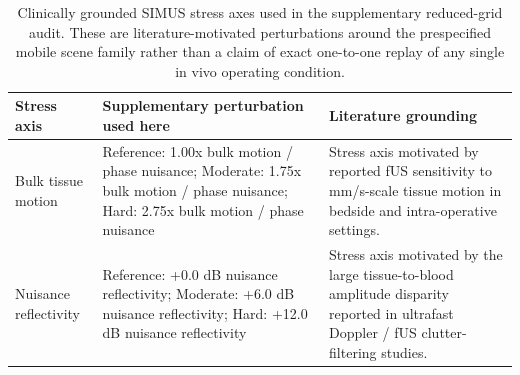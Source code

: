 \begin{table}[t]
\centering
\scriptsize
\setlength{\tabcolsep}{4pt}
\begin{tabular}{@{}P{2.6cm} P{4.8cm} P{5.2cm}@{}}
\hline
Stress axis & Supplementary perturbation used here & Literature grounding \\
\hline
Bulk tissue motion & Reference: 1.00x bulk motion / phase nuisance; Moderate: 1.75x bulk motion / phase nuisance; Hard: 2.75x bulk motion / phase nuisance & Stress axis motivated by reported fUS sensitivity to mm/s-scale tissue motion in bedside and intra-operative settings. \cite{DemeneClutterSVD2015,Soloukey2020FUSAwake,MobileFUS2025} \\
Nuisance reflectivity & Reference: +0.0 dB nuisance reflectivity; Moderate: +6.0 dB nuisance reflectivity; Hard: +12.0 dB nuisance reflectivity & Stress axis motivated by the large tissue-to-blood amplitude disparity reported in ultrafast Doppler / fUS clutter-filtering studies. \cite{DemeneClutterSVD2015,BarangerAdaptiveSVD2018} \\
\hline
\end{tabular}
\caption{Clinically grounded SIMUS stress axes used in the supplementary reduced-grid audit. These are literature-motivated perturbations around the prespecified mobile scene family rather than a claim of exact one-to-one replay of any single in vivo operating condition.}
\label{tab:simus_clinical_stress_provenance}
\end{table}

